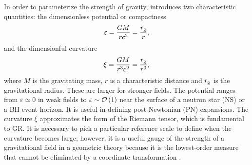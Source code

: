 In order to parameterize the strength of gravity, \citet{Psaltis2008a} introduces two characteristic quantities: the dimensionless potential or compactness \citep{Yunes2013}
\begin{equation}
\varepsilon = \dfrac{GM}{rc^2} = \dfrac{r_\mathrm{g}}{r},
\end{equation}
and the dimensionful curvature
\begin{equation}
\xi = \dfrac{GM}{r^3c^2} = \dfrac{r_\mathrm{g}}{r^3},
\end{equation}
where $M$ is the gravitating mass, $r$ is a characteristic distance and $r_\mathrm{g}$ is the gravitational radius. These are larger for stronger fields. The potential ranges from $\varepsilon \simeq 0$ in weak fields to $\varepsilon \sim \mathcal{O}\left({1}\right)$ near the surface of a neutron star (NS) or a BH event horizon. It is useful in defining post-Newtonian (PN) expansions. The curvature $\xi$ approximates the form of the Riemann tensor, which is fundamental to GR. It is necessary to pick a particular reference scale to define when the curvature becomes large; however, it is a useful gauge of the strength of a gravitational field in a geometric theory because it is the lowest-order measure that cannot be eliminated by a coordinate transformation \citep[chapter 7]{Hobson2006}.


